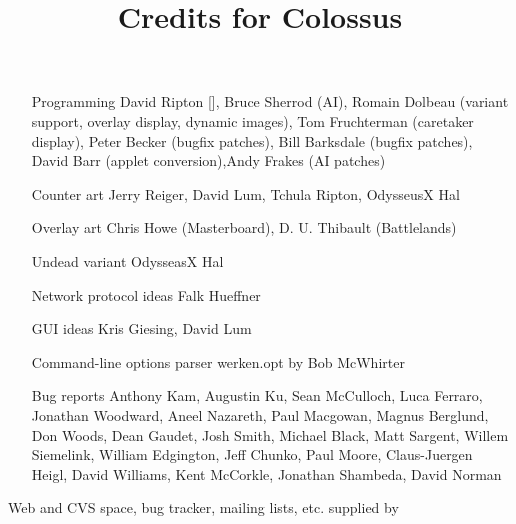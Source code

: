 \documentclass{article}
\begin{document}

\title{Credits for Colossus}

\maketitle

\begin{itemize}

\item[Programming] David Ripton [], Bruce Sherrod (AI), Romain Dolbeau (variant support, overlay display, dynamic images), Tom Fruchterman (caretaker display), Peter Becker (bugfix patches), Bill Barksdale (bugfix patches), David Barr (applet conversion),Andy Frakes (AI patches)

\item[Counter art] Jerry Reiger, David Lum, Tchula Ripton, OdysseusX Hal

\item[Overlay art] Chris Howe (Masterboard), D. U. Thibault (Battlelands)

\item[Undead variant] OdysseasX Hal

\item[Network protocol ideas] Falk Hueffner

\item[GUI ideas] Kris Giesing, David Lum

\item[Command-line options parser] werken.opt by Bob McWhirter

\item[Bug reports] Anthony Kam, Augustin Ku, Sean McCulloch, Luca Ferraro, Jonathan Woodward, Aneel Nazareth, Paul Macgowan, Magnus Berglund, Don Woods, Dean Gaudet, Josh Smith, Michael Black, Matt Sargent, Willem Siemelink, William Edgington, Jeff Chunko, Paul Moore, Claus-Juergen Heigl, David Williams, Kent McCorkle, Jonathan Shambeda, David Norman


\end{itemize}

Web and CVS space, bug tracker, mailing lists, etc. supplied by 
\end{document}
